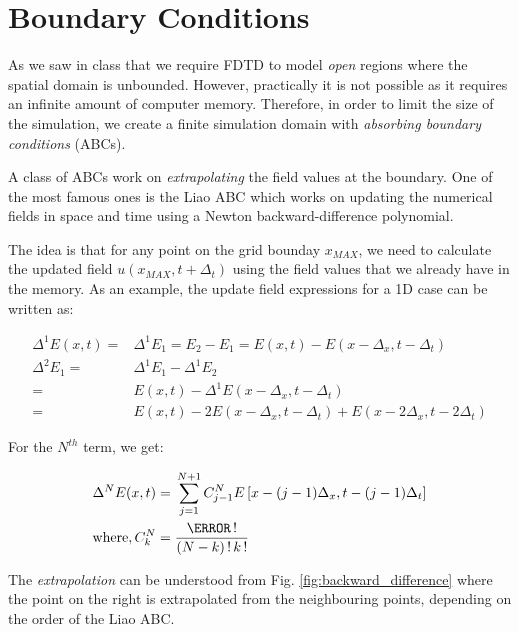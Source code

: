 \documentclass[12pt]{article}
\begin{document}
\section{Boundary Conditions}

As we saw in class that we require FDTD to model \textit{open} regions where the spatial domain is unbounded. However, practically it is not possible as it requires an infinite amount of computer memory. Therefore, in order to limit the size of the simulation, we create a finite simulation domain with \textit{absorbing boundary conditions} (ABCs).

A class of ABCs work on \textit{extrapolating} the field values at the boundary. One of the most famous ones is the Liao ABC \cite{liao_transmitting_1984} which works on updating the numerical fields in space and time using a Newton backward-difference polynomial.


The idea is that for any point on the grid bounday $x_{MAX}$, we need to calculate the updated field $u(x_{MAX}, t + \Delta_t)$ using the field values that we already have in the memory. As an example, the update field expressions for a 1D case can be written as:

\begin{align}
  \Delta^1 E(x ,t) ={} & \Delta^1 E_1 = E_2 - E_1  = E(x,t) - E(x - \Delta_x, t - \Delta_t) \nonumber \\
  \Delta^2 E_1 ={}     & \Delta^1 E_1 - \Delta^1 E_2 \nonumber                                        \\
  ={}                  & E(x,t) - \Delta^1 E(x - \Delta_x, t - \Delta_t) \nonumber                    \\
  ={}                  & E(x,t) - 2E(x - \Delta_x, t - \Delta_t) + E(x - 2\Delta_x, t - 2\Delta_t)
\end{align}

For the $N^{th}$ term, we get:

\begin{align}
  \Delta^N E(x ,t) ={}         & \sum_{j = 1}^{N+1} C_{j-1}^{N} E\left[x - (j -1)\Delta_x, t - (j -1)\Delta_t\right] \nonumber \\
  \mathrm{where,} \, C_k^N ={} & \frac{\N\,!}{(N - k)\,! \, k\,!}
\end{align}

The \textit{extrapolation} can be understood from Fig. \ref{fig:backward_difference} where the point on the right is extrapolated from the neighbouring points, depending on the order of the Liao ABC.
\end{document}
